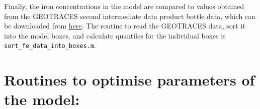 \documentclass[a4paper]{scrartcl}
\begin{document}
Finally, the iron concentrations in the model are compared to values
obtained from the GEOTRACES second intermediate data product bottle
data, which can be downloaded from
\href{https://www.bodc.ac.uk/data/download/asset/2135/generic/}{here}. The
routine to read the GEOTRACES data, sort it into the model boxes, and
calculate quantiles for the individual boxes is
\verb+sort_fe_data_into_boxes.m+.

\section{Routines to optimise parameters of the model:}
\end{document}
